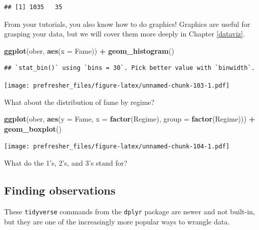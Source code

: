 \documentclass[]{book}
\newenvironment{Shaded}{\begin{snugshade}}{\end{snugshade}}
\newcommand{\DataTypeTok}[1]{\textcolor[rgb]{0.13,0.29,0.53}{#1}}
\newcommand{\KeywordTok}[1]{\textcolor[rgb]{0.13,0.29,0.53}{\textbf{#1}}}
\newcommand{\NormalTok}[1]{#1}
\newcommand{\OperatorTok}[1]{\textcolor[rgb]{0.81,0.36,0.00}{\textbf{#1}}}
\newcommand{\StringTok}[1]{\textcolor[rgb]{0.31,0.60,0.02}{#1}}
\theoremstyle{definition}
\theoremstyle{definition}
\theoremstyle{definition}
\theoremstyle{remark}
\begin{document}
\begin{verbatim}
## [1] 1035   35
\end{verbatim}

From your tutorials, you also know how to do graphics! Graphics are useful for grasping your data, but we will cover them more deeply in Chapter \ref{dataviz}.

\begin{Shaded}
\begin{Highlighting}[]
\KeywordTok{ggplot}\NormalTok{(ober, }\KeywordTok{aes}\NormalTok{(}\DataTypeTok{x =}\NormalTok{ Fame)) }\OperatorTok{+}\StringTok{ }\KeywordTok{geom_histogram}\NormalTok{()}
\end{Highlighting}
\end{Shaded}

\begin{verbatim}
## `stat_bin()` using `bins = 30`. Pick better value with `binwidth`.
\end{verbatim}

\texttt{[image: prefresher\_files/figure-latex/unnamed-chunk-103-1.pdf]}

What about the distribution of fame by regime?

\begin{Shaded}
\begin{Highlighting}[]
\KeywordTok{ggplot}\NormalTok{(ober, }\KeywordTok{aes}\NormalTok{(}\DataTypeTok{y =}\NormalTok{ Fame, }\DataTypeTok{x =} \KeywordTok{factor}\NormalTok{(Regime), }\DataTypeTok{group =} \KeywordTok{factor}\NormalTok{(Regime))) }\OperatorTok{+}
\StringTok{  }\KeywordTok{geom_boxplot}\NormalTok{()}
\end{Highlighting}
\end{Shaded}

\texttt{[image: prefresher\_files/figure-latex/unnamed-chunk-104-1.pdf]}

What do the 1's, 2's, and 3's stand for?

\hypertarget{finding-observations}{%
\subsection{Finding observations}\label{finding-observations}}

These \texttt{tidyverse} commands from the \texttt{dplyr} package are newer and not built-in, but they are one of the increasingly more popular ways to wrangle data.
\end{document}
